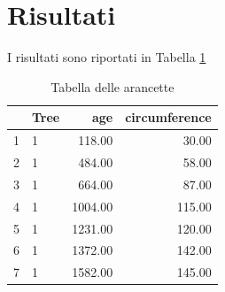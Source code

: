 \documentclass[
]{article}
\begin{document}
\newpage

\hypertarget{risultati}{%
\section{Risultati}\label{risultati}}

I risultati sono riportati in Tabella \ref{tab:tabella}

\begin{table}[ht]
\centering
\caption{Tabella delle arancette} 
\label{tab:tabella}
\begin{tabular}{rlrr}
  \hline
 & Tree & age & circumference \\ 
  \hline
1 & 1 & 118.00 & 30.00 \\ 
  2 & 1 & 484.00 & 58.00 \\ 
  3 & 1 & 664.00 & 87.00 \\ 
  4 & 1 & 1004.00 & 115.00 \\ 
  5 & 1 & 1231.00 & 120.00 \\ 
  6 & 1 & 1372.00 & 142.00 \\ 
  7 & 1 & 1582.00 & 145.00 \\ 
   \hline
\end{tabular}
\end{table}
\newpage

\printbibliography
\end{document}
